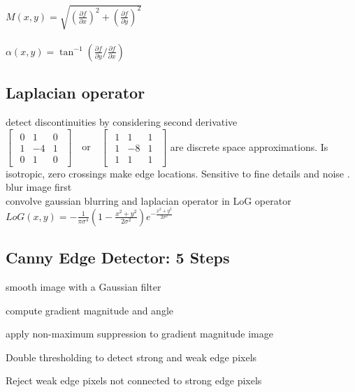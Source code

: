 \\
$M(x, y) = \sqrt{(\frac{\partial f}{\partial x})^{2} + (\frac{\partial f}{\partial y})^{2}}$\\
 \\
$\alpha(x, y) = \tan^{-1}(\frac{\partial f}{\partial y} / \frac{\partial f}{\partial x})$
\subsection*{Laplacian operator}
detect discontinuities by considering second derivative
$\begin{bmatrix}
    \begin{smallmatrix}
        0 & 1 & 0\\
        1 & -4 & 1\\
        0 & 1 & 0
    \end{smallmatrix}
\end{bmatrix}
\quad \text{or} \quad
\begin{bmatrix}
    \begin{smallmatrix}
        1 & 1 & 1\\
        1 & -8 & 1\\
        1 & 1 & 1
    \end{smallmatrix}
\end{bmatrix}$
are discrete space approximations. Is isotropic, zero crossings make edge locations. Sensitive to fine details and noise .\\ blur image first \\
 convolve gaussian blurring and laplacian operator in LoG operator  $LoG(x, y) = -\frac{1}{\pi \sigma^{4}} (1 - \frac{x^{2} + y^{2}}{2\sigma^{2}}) e^{-\frac{x^{2} + y^{2}}{2\sigma^{2}}}$
\subsection*{Canny Edge Detector: 5 Steps}
\begin{compactenum}
    \item smooth image with a Gaussian filter
    \item compute gradient magnitude and angle
    \item apply non-maximum suppression to gradient magnitude image 
    \item Double thresholding to detect strong and weak edge pixels
    \item Reject weak edge pixels not connected to strong edge pixels
\end{compactenum}
